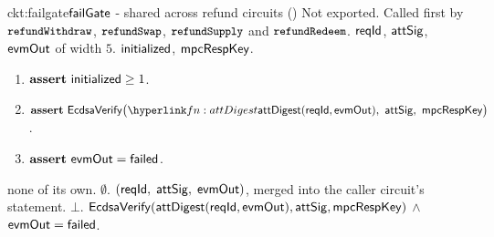 \begin{CktBox}{ckt:failgate}{$\mathsf{failGate}$ - shared across refund circuits (\srcFailGate)}
Not exported. Called first by $\texttt{\small refundWithdraw}$, $\texttt{\small refundSwap}$, $\texttt{\small refundSupply}$ and
$\texttt{\small refundRedeem}$.
 $\mathsf{reqId}$, $\mathsf{attSig}$, $\mathsf{evmOut}$ of width $5$.
 $\mathsf{initialized}$, $\mathsf{mpcRespKey}$.
\begin{enumerate}[nosep,leftmargin=1.7em,topsep=2pt]
\item $\textbf{assert}~ \mathsf{initialized} \geq 1$.
\item $\assert \EcdsaVf\bigl(\lnk{fn:attDigest}{\attDigest(\rid, \evmOut)}\bc \attSig\bc
      \mpcRespKey\bigr)$.
\item $\textbf{assert}~ \mathsf{evmOut} = \mathsf{failed}$.
\end{enumerate}
\begin{OutList}
\oitem{\Dvault} none of its own.
\oitem{\Dshd} $\emptyset$.
\oitem{\stmt} $(\mathsf{reqId},\; \mathsf{attSig},\; \mathsf{evmOut})$, merged into the caller circuit's statement.
\oitem{\wit} $\bot$.
\oitem{\Rel} $\mathsf{EcdsaVerify}(\mathsf{attDigest}(\mathsf{reqId},\mathsf{evmOut}), \mathsf{attSig}, \mathsf{mpcRespKey})$ \;$\wedge$\;
  $\mathsf{evmOut} = \mathsf{failed}$.
\end{OutList}
\end{CktBox}


